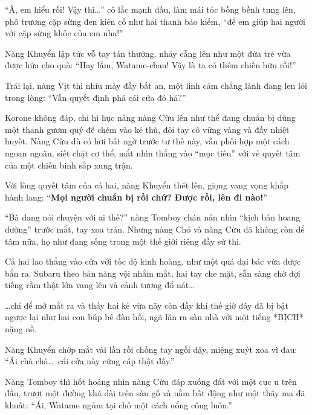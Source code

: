 \documentclass[../main.tex]{subfiles}
\begin{document}
\begin{figure}[H]
  \centering
\end{figure}

``À, em hiểu rồi! Vậy thì\dots'' cô lắc mạnh đầu, làm mái tóc bồng bềnh tung lên, phô trương cặp sừng đen kiên cố như hai thanh bảo kiếm, ``để em giúp hai người với cặp sừng khỏe của em nha!''

Nàng Khuyển lập tức vỗ tay tán thưởng, nhảy cẫng lên như một đứa trẻ vừa được hứa cho quà: ``Hay lắm, Watame-chan! Vậy là ta có thêm chiến hữu rồi!''

Trái lại, nàng Vịt thì nhíu mày đầy bất an, một linh cảm chẳng lành đang len lỏi trong lòng: ``Vẫn quyết định phá cái cửa đó hả?''


Korone không đáp, chỉ hì hục nâng nàng Cừu lên như thể đang chuẩn bị dùng một thanh gươm quý để chém vào kẻ thù, đôi tay cô vững vàng và đầy nhiệt huyết. Nàng Cừu dù có hơi bất ngờ trước tư thế này, vẫn phối hợp một cách ngoan ngoãn, siết chặt cơ thể, mắt nhìn thẳng vào ``mục tiêu'' với vẻ quyết tâm của một chiến binh sắp xung trận.

Với lòng quyết tâm của cả hai, nàng Khuyển thét lên, giọng vang vọng khắp hành lang: ``\textbf{Mọi người chuẩn bị rồi chứ? Được rồi, lên đi nào!}''

``Bà đang nói chuyện với ai thế?'' nàng Tomboy chán nản nhìn ``kịch bản hoang đường'' trước mắt, tay xoa trán. Nhưng nàng Chó và nàng Cừu đã không còn để tâm nữa, họ như đang sống trong một thế giới riêng đầy sử thi.


Cả hai lao thẳng vào cửa với tốc độ kinh hoàng, như một quả đại bác vừa được bắn ra. Subaru theo bản năng vội nhắm mắt, hai tay che mặt, sẵn sàng chờ đợi tiếng rầm thật lớn vang lên và cảnh tượng đổ nát\dots

\dots chỉ để mở mắt ra và thấy hai kẻ vừa nãy còn đầy khí thế giờ đây đã bị bật ngược lại như hai con búp bê đàn hồi, ngã lăn ra sàn nhà với một tiếng *BỊCH* nặng nề.


Nàng Khuyển chớp mắt vài lần rồi chống tay ngồi dậy, miệng xuýt xoa vì đau: ``Ái chà chà\dots\ cái cửa này cứng cáp thật đấy.''

Nàng Tomboy thì hốt hoảng nhìn nàng Cừu đáp xuống đất với một cục u trên đầu, trượt một đường khá dài trên sàn gỗ và nằm bất động như một thây ma đã khuất: ``Ái, Watame ngủm tại chỗ một cách uổng công luôn.''
\end{document}
